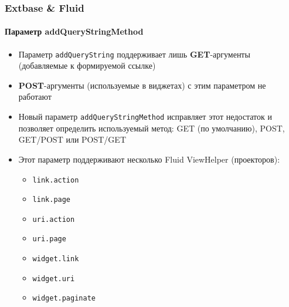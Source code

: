\begin{frame}[fragile]
	\frametitle{Extbase \& Fluid}
	\framesubtitle{Параметр addQueryStringMethod}

	\begin{itemize}
		\item Параметр \texttt{addQueryString} поддерживает лишь \textbf{GET}-аргументы\newline
			\small(добавляемые к формируемой ссылке)\normalsize
		\item \textbf{POST}-аргументы (используемые в виджетах) с этим параметром не работают
		\item Новый параметр \texttt{addQueryStringMethod} исправляет этот недостаток и позволяет определить используемый метод:\newline
			GET (по умолчанию), POST, GET/POST или POST/GET
		\item Этот параметр поддерживают несколько Fluid ViewHelper (проекторов):

			\begin{itemize}\smaller
				\item \texttt{link.action}
				\item \texttt{link.page}
				\item \texttt{uri.action}
				\item \texttt{uri.page}
				\item \texttt{widget.link}
				\item \texttt{widget.uri}
				\item \texttt{widget.paginate}
			\end{itemize}

	\end{itemize}

\end{frame}



